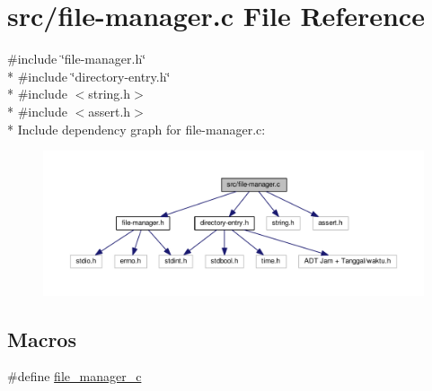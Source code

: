 \hypertarget{file-manager_8c}{\section{src/file-\/manager.c File Reference}
\label{file-manager_8c}
}
{\ttfamily \#include \char`\"{}file-\/manager.\-h\char`\"{}}\\*
{\ttfamily \#include \char`\"{}directory-\/entry.\-h\char`\"{}}\\*
{\ttfamily \#include $<$string.\-h$>$}\\*
{\ttfamily \#include $<$assert.\-h$>$}\\*
Include dependency graph for file-\/manager.c\-:
\nopagebreak
\begin{figure}[H]
\begin{center}
\leavevmode
\includegraphics[width=350pt]{file-manager_8c__incl}
\end{center}
\end{figure}
\subsection*{Macros}
\begin{DoxyCompactItemize}
\item 
\#define \hyperlink{file-manager_8c_a4cf8a8494b61cb9b9cbadc130d35f662}{file\-\_\-manager\-\_\-c}
\end{DoxyCompactItemize}
